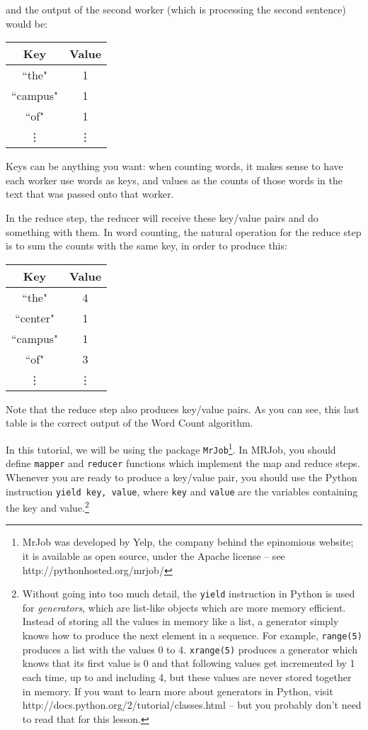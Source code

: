 and the output of the second worker (which is processing the second sentence) would be:

\begin{center}
\begin{tabular}{|c|c|}
\hline
Key & Value \\
\hline\hline
``the" & 1 \\
``campus" & 1 \\
``of" & 1\\
\vdots & \vdots \\
\end{tabular}
\end{center}

Keys can be anything you want: when counting words, it makes sense to have each worker use words as keys, and values as the counts of those words in the text that was passed onto that worker.

In the reduce step, the reducer will receive these key/value pairs and do something with them. In word counting, the natural operation for the reduce step is to sum the counts with the same key, in order to produce this:

\begin{center}
\begin{tabular}{|c|c|}
\hline
Key & Value \\
\hline\hline
``the" & 4 \\
``center" & 1 \\
``campus" & 1 \\
``of" & 3\\
\vdots & \vdots \\
\end{tabular}
\end{center}

Note that the reduce step also produces key/value pairs. As you can see, this last table is the correct output of the Word Count algorithm.

In this tutorial, we will be using the package \texttt{MrJob}\footnote{MrJob was developed by Yelp, the company behind the epinomious website; it is available
as open source, under the Apache license -- see http://pythonhosted.org/mrjob/}. In MRJob, you should define \texttt{mapper} and \texttt{reducer} functions which implement the map and reduce steps. Whenever you are ready to produce a key/value pair, you should use the Python instruction \texttt{yield key, value}, where \texttt{key} and \texttt{value} are the variables containing the key and value.\footnote{Without going into too much detail, the \texttt{yield} instruction in Python is used for \emph{generators}, which are list-like objects which are more memory efficient. Instead of storing all the values in memory like a list, a generator simply knows how to produce the next element in a sequence. For example, \texttt{range(5)} produces a list with the values 0 to 4. \texttt{xrange(5)} produces a generator which knows that its first value is 0 and that following values get incremented by 1 each time, up to and including 4, but these values are never stored together in memory. If you want to learn more about generators in Python, visit http://docs.python.org/2/tutorial/classes.html -- but you probably don't need to read that for this lesson.}

